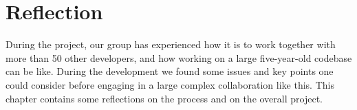 \chapter{Reflection}
\label{cha:reflection}

During the \giraf project, our group has experienced how it is to work together with more than 50 other developers, and how working on a large five-year-old codebase can be like. During the development we found some issues and key points one could consider before engaging in a large complex collaboration like this. This chapter contains some reflections on the process and on the overall project.



